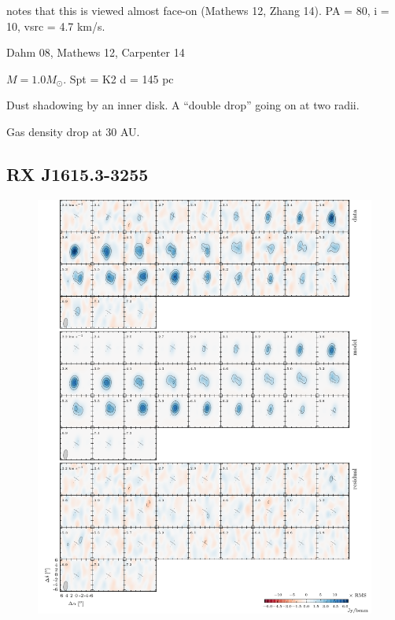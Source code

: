 \documentclass{aastex6}
\begin{document}
\citep{vandermarel15} notes that this is viewed almost face-on (Mathews 12, Zhang 14). PA = 80, i = 10, vsrc = 4.7 km/s.

Dahm 08, Mathews 12, Carpenter 14

$M = 1.0 M_\odot$.
Spt = K2
d = 145 pc

Dust shadowing by an inner disk. A ``double drop'' going on at two radii.

Gas density drop at 30 AU.


\subsection{RX J1615.3-3255}
\begin{figure}[htb]
\begin{center}
  \includegraphics{RXJ1615.pdf}
  \end{center}
\end{figure}
\end{document}
